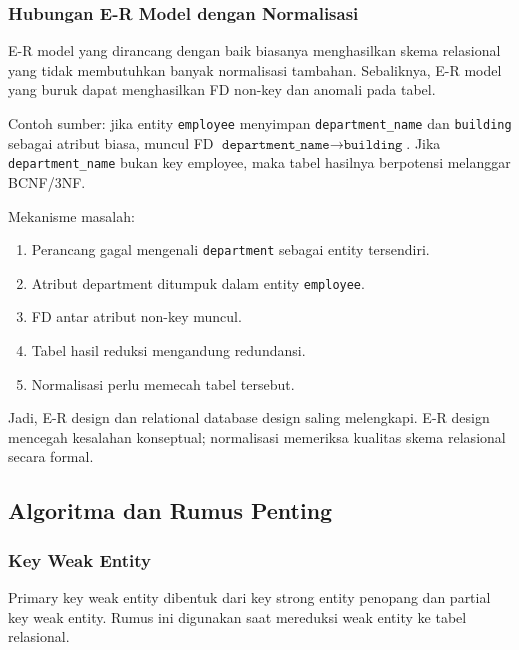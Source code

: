 \subsubsection{Hubungan E-R Model dengan Normalisasi}

\begin{jawab}
E-R model yang dirancang dengan baik biasanya menghasilkan skema relasional yang tidak membutuhkan banyak normalisasi tambahan. Sebaliknya, E-R model yang buruk dapat menghasilkan FD non-key dan anomali pada tabel.
\end{jawab}

Contoh sumber: jika entity \texttt{employee} menyimpan \texttt{department\_name} dan \texttt{building} sebagai atribut biasa, muncul FD \(\texttt{department\_name} \rightarrow \texttt{building}\). Jika \texttt{department\_name} bukan key employee, maka tabel hasilnya berpotensi melanggar BCNF/3NF.

Mekanisme masalah:
\begin{enumerate}
    \item Perancang gagal mengenali \texttt{department} sebagai entity tersendiri.
    \item Atribut department ditumpuk dalam entity \texttt{employee}.
    \item FD antar atribut non-key muncul.
    \item Tabel hasil reduksi mengandung redundansi.
    \item Normalisasi perlu memecah tabel tersebut.
\end{enumerate}

Jadi, E-R design dan relational database design saling melengkapi. E-R design mencegah kesalahan konseptual; normalisasi memeriksa kualitas skema relasional secara formal.

\subsection{Algoritma dan Rumus Penting}

\subsubsection{Key Weak Entity}

\begin{jawab}
Primary key weak entity dibentuk dari key strong entity penopang dan partial key weak entity. Rumus ini digunakan saat mereduksi weak entity ke tabel relasional.
\end{jawab}

